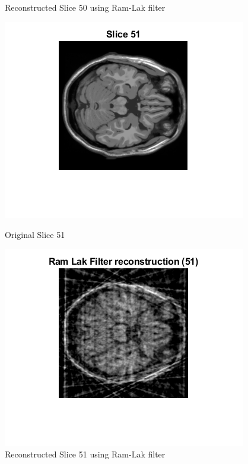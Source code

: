 \documentclass[12pt]{article}
\begin{document}
\begin{enumerate}[label = (\alph*)]
\begin{figure}[H]
\begin{minipage}{.45\textwidth}
            \caption*{Reconstructed Slice 50 using Ram-Lak filter}
        \end{minipage}
    \end{figure}
    \begin{figure}[H]
        \centering
        \begin{minipage}{.45\textwidth}
            \centering
            \includegraphics[width=\linewidth]{Images/Q3_51.png}
            \caption*{Original Slice 51}
        \end{minipage}
        \begin{minipage}{.45\textwidth}
            \centering
            \includegraphics[width=\linewidth]{Images/Q3_51_a.png}
            \caption*{Reconstructed Slice 51 using Ram-Lak filter}
        \end{minipage}
    \end{figure}


\end{enumerate}
\end{document}
